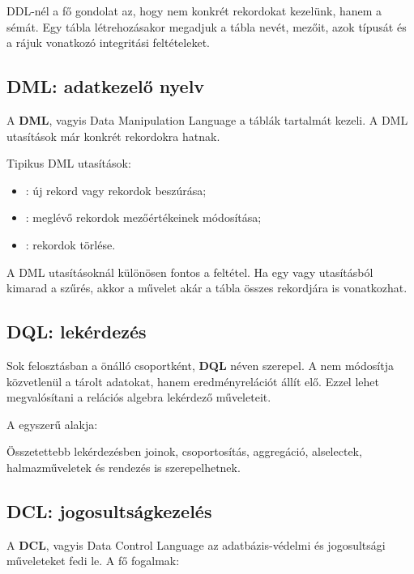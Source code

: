 DDL-nél a fő gondolat az, hogy nem konkrét rekordokat kezelünk, hanem a sémát. Egy tábla létrehozásakor megadjuk a tábla nevét, mezőit, azok típusát és a rájuk vonatkozó integritási feltételeket.

\subsection{DML: adatkezelő nyelv}

A \textbf{DML}, vagyis Data Manipulation Language a táblák tartalmát kezeli. A DML utasítások már konkrét rekordokra hatnak.

Tipikus DML utasítások:

\begin{itemize}
  \item {}: új rekord vagy rekordok beszúrása;
  \item {}: meglévő rekordok mezőértékeinek módosítása;
  \item {}: rekordok törlése.
\end{itemize}

A DML utasításoknál különösen fontos a  feltétel. Ha egy  vagy  utasításból kimarad a szűrés, akkor a művelet akár a tábla összes rekordjára is vonatkozhat.

\subsection{DQL: lekérdezés}

Sok felosztásban a  önálló csoportként, \textbf{DQL} néven szerepel. A  nem módosítja közvetlenül a tárolt adatokat, hanem eredményrelációt állít elő. Ezzel lehet megvalósítani a relációs algebra lekérdező műveleteit.

A  egyszerű alakja:

\begin{center}
\end{center}

Összetettebb lekérdezésben joinok, csoportosítás, aggregáció, alselectek, halmazműveletek és rendezés is szerepelhetnek.

\subsection{DCL: jogosultságkezelés}

A \textbf{DCL}, vagyis Data Control Language az adatbázis-védelmi és jogosultsági műveleteket fedi le. A fő fogalmak:

